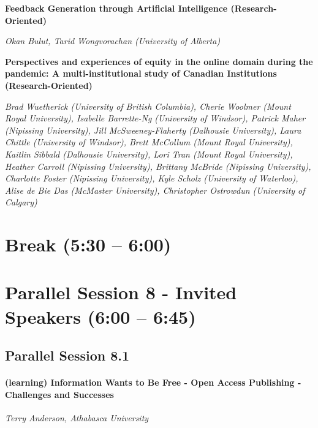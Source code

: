 \documentclass[
]{book}
\begin{document}
\begin{secondary}
\textbf{Feedback Generation through Artificial Intelligence
(Research-Oriented)}

\emph{Okan Bulut, Tarid Wongvorachan (University of Alberta)}
\end{secondary}

\begin{secondary}
\textbf{Perspectives and experiences of equity in the online domain
during the pandemic: A multi-institutional study of Canadian
Institutions (Research-Oriented)}

\emph{Brad Wuetherick (University of British Columbia), Cherie Woolmer
(Mount Royal University), Isabelle Barrette-Ng (University of Windsor),
Patrick Maher (Nipissing University), Jill McSweeney-Flaherty (Dalhousie
University), Laura Chittle (University of Windsor), Brett McCollum
(Mount Royal University), Kaitlin Sibbald (Dalhousie University), Lori
Tran (Mount Royal University), Heather Carroll (Nipissing University),
Brittany McBride (Nipissing University), Charlotte Foster (Nipissing
University), Kyle Scholz (University of Waterloo), Alise de Bie Das
(McMaster University), Christopher Ostrowdun (University of Calgary)}
\end{secondary}

\hypertarget{break-530-600}{%
\section*{Break (5:30 -- 6:00)}\label{break-530-600}}

\hypertarget{parallel-session-8---invited-speakers-600-645}{%
\section*{Parallel Session 8 - Invited Speakers (6:00 -- 6:45)}\label{parallel-session-8---invited-speakers-600-645}}

\hypertarget{parallel-session-8.1}{%
\subsection*{Parallel Session 8.1}\label{parallel-session-8.1}}

\begin{reflect}
\hypertarget{learning-information-wants-to-be-free---open-access-publishing---challenges-and-successes}{%
\paragraph{(learning) Information Wants to Be Free - Open Access
Publishing - Challenges and
Successes}\label{learning-information-wants-to-be-free---open-access-publishing---challenges-and-successes}}

\emph{Terry Anderson, Athabasca University}
\end{reflect}
\end{document}
